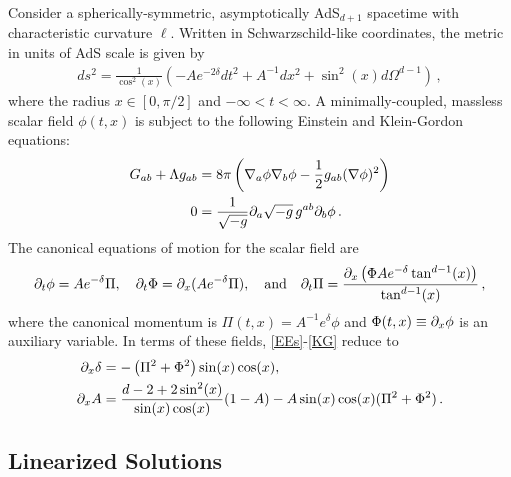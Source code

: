 \documentclass[../PhD.tex]{subfiles}
\begin{document}
Consider a spherically-symmetric, asymptotically AdS$_{d+1}$ spacetime with characteristic curvature $\ell$. Written in Schwarzschild-like coordinates, the metric in units of AdS scale is given by
\begin{align}
ds^2 = \frac{1}{\cos^2(x)} \left( -Ae^{-2\delta} dt^2 + A^{-1}dx^2 + \sin^2(x) d\Omega^{d-1}\right) \, ,
\end{align}
where the radius $x \in [0,\pi/2]$ and $-\infty < t < \infty$. A minimally-coupled, massless scalar field $\phi(t,x)$ is subject to the following Einstein and Klein-Gordon equations:
\begin{align}
\label{EEs}
G_{ab} + \Lambda g_{ab} &= 8\pi \left( \nabla_a \phi \nabla_b \phi - \frac{1}{2} g_{ab} (\nabla \phi)^2 \right) \\
\label{KG}
0 &= \frac{1}{\sqrt{-g}} \partial_a \sqrt{-g} \, g^{ab} \partial_b \phi \, .
\end{align}
The canonical equations of motion for the scalar field are
\begin{align}
\partial_t \phi = A e^{-\delta} \Pi, \quad \partial_t \Phi = \partial_x ( A e^{-\delta} \Pi), \quad \text{and} \quad \partial_t \Pi = \frac{\partial_x \left(\Phi A e^{-\delta} \tan^{d-1} (x) \right)}{\tan^{d-1}(x)} \, ,
\end{align}
where the canonical momentum is $\Pi(t,x) = A^{-1}e^\delta \phi$ and $\Phi(t,x) \equiv \partial_x \phi$ is an auxiliary variable. In terms of these fields, \eqref{EEs}-\eqref{KG} reduce to 
\begin{align}
	\label{EE const1}
	\partial_x \delta &= - \left( \Pi^2 + \Phi^2 \right) \sin(x) \cos(x), \\
	\label{EE const2}
	\partial_x A &= \frac{d - 2 + 2\sin^2(x)}{\sin (x)\cos(x)} (1 - A) - A \sin(x) \cos(x) (\Pi^2 + \Phi^2) \, .
\end{align}


\subsection{Linearized Solutions}
\end{document}
